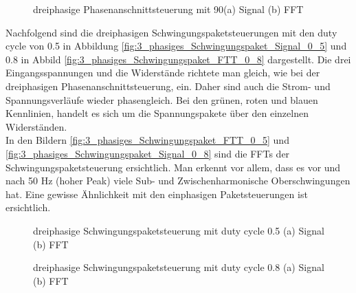 \begin{figure}[ht!]
	\centering
	\qquad
	\caption{dreiphasige Phasenanschnittsteuerung mit 90\textdegree (a) Signal (b) FFT}
	\label{fig:dreiphasige_Phasenanschnittsteuerung_mit_90}
\end{figure}



Nachfolgend sind die dreiphasigen Schwingungspaketsteuerungen mit den duty cycle von 0.5 in Abbildung \ref{fig:3_phasiges_Schwingungspaket_Signal_0_5} und 0.8 in Abbild \ref{fig:3_phasiges_Schwingungspaket_FTT_0_8} dargestellt. Die drei Eingangsspannungen und die Widerstände richtete man gleich, wie bei der dreiphasigen Phasenanschnittsteuerung, ein. Daher sind auch die Strom- und Spannungsverläufe wieder phasengleich. Bei den grünen, roten und blauen Kennlinien, handelt es sich um die Spannungspakete über den einzelnen Widerständen.\\
In den Bildern \ref{fig:3_phasiges_Schwingungspaket_FTT_0_5} und \ref{fig:3_phasiges_Schwingungspaket_Signal_0_8} sind die FFTs der Schwingungspaketsteuerung ersichtlich. Man erkennt vor allem, dass es vor und nach 50 Hz (hoher Peak) viele Sub- und Zwischenharmonische Oberschwingungen hat. Eine gewisse Ähnlichkeit mit den einphasigen Paketsteuerungen ist ersichtlich.
 

\begin{figure}[ht!]
	\centering
	\qquad
	\caption{dreiphasige Schwingungspaketsteuerung mit duty cycle 0.5 (a) Signal (b) FFT}
	\label{fig:3_phasiges_Schwingungspaket_0_5}
\end{figure}



\begin{figure}[ht!]
	\centering
	\qquad
	\caption{dreiphasige Schwingungspaketsteuerung mit duty cycle 0.8 (a) Signal (b) FFT}
	\label{fig:3_phasiges_Schwingungspaket_0_8}
\end{figure}

